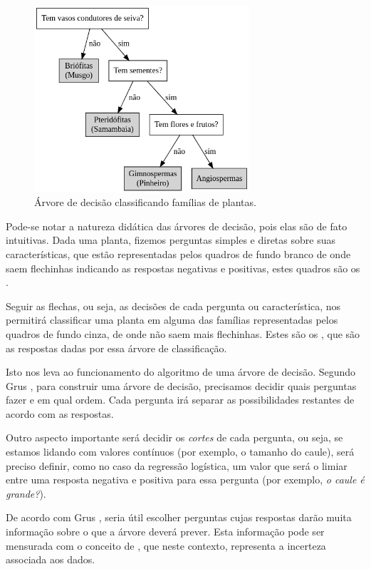\begin{figure}[htb]
\centering
\includegraphics[width=8cm]{figuras/plantas}
\caption{Árvore de decisão classificando famílias de plantas.}
\label{fig:plantas}
\end{figure}

Pode-se notar a natureza didática das árvores de decisão, pois elas são de fato intuitivas. Dada uma planta, fizemos perguntas simples e diretas sobre suas características, que estão representadas pelos quadros de fundo branco de onde saem flechinhas indicando as respostas negativas e positivas, estes quadros são os .

Seguir as flechas, ou seja, as decisões de cada pergunta ou característica, nos permitirá classificar uma planta em alguma das famílias representadas pelos quadros de fundo cinza, de onde não saem mais flechinhas. Estes são os , que são as respostas dadas por essa árvore de classificação.

Isto nos leva ao funcionamento do algoritmo de uma árvore de decisão. Segundo Grus \citep{data}, para construir uma árvore de decisão, precisamos decidir quais perguntas fazer e em qual ordem. Cada pergunta irá separar as possibilidades restantes de acordo com as respostas. 

Outro aspecto importante será decidir os \emph{cortes} de cada pergunta, ou seja, se estamos lidando com valores contínuos (por exemplo, o tamanho do caule), será preciso definir, como no caso da regressão logística, um valor que será o limiar entre uma resposta negativa e positiva para essa pergunta (por exemplo, \emph{o caule é grande?}).

De acordo com Grus \citep{data}, seria útil escolher perguntas cujas respostas darão muita informação sobre o que a árvore deverá prever. Esta informação pode ser mensurada com o conceito de , que neste contexto, representa a incerteza associada aos dados.


